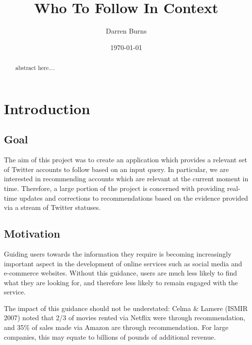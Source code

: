 \documentclass{l4proj}
\begin{document}
\title{Who To Follow In Context}
\author{Darren Burns}
\date{\today}
\maketitle

\begin{abstract}

abstract here....

\end{abstract}

\educationalconsent
%
%
\tableofcontents

\chapter{Introduction}


\section{Goal}
The aim of this project was to create an application which provides a relevant set of Twitter accounts to follow based on an input query. In particular, we are interested in recommending accounts which are relevant at the current moment in time. Therefore, a large portion of the project is concerned with providing real-time updates and corrections to recommendations based on the evidence provided via a stream of Twitter statuses.


\section{Motivation}
Guiding users towards the information they require is becoming increasingly important aspect in the development of online services such as social media and e-commerce websites. Without this guidance, users are much less likely to find what they are looking for, and therefore less likely to remain engaged with the service.

The impact of this guidance should not be understated: Celma \& Lamere (ISMIR 2007) noted that 2/3 of movies rented via Netflix were through recommendation, and 35\% of sales made via Amazon are through recommendation. For large companies, this may equate to billions of pounds of additional revenue.
\end{document}
